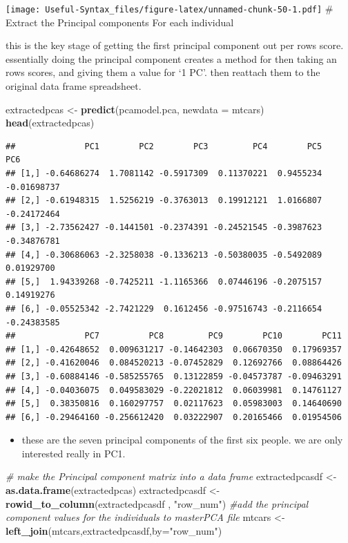 \documentclass[
]{article}
\newenvironment{Shaded}{\begin{snugshade}}{\end{snugshade}}
\newcommand{\AttributeTok}[1]{\textcolor[rgb]{0.13,0.29,0.53}{#1}}
\newcommand{\CommentTok}[1]{\textcolor[rgb]{0.56,0.35,0.01}{\textit{#1}}}
\newcommand{\FunctionTok}[1]{\textcolor[rgb]{0.13,0.29,0.53}{\textbf{#1}}}
\newcommand{\NormalTok}[1]{#1}
\newcommand{\OtherTok}[1]{\textcolor[rgb]{0.56,0.35,0.01}{#1}}
\newcommand{\StringTok}[1]{\textcolor[rgb]{0.31,0.60,0.02}{#1}}
\providecommand{\tightlist}{%
  \setlength{\itemsep}{0pt}\setlength{\parskip}{0pt}}
\begin{document}
\texttt{[image: Useful-Syntax\_files/figure-latex/unnamed-chunk-50-1.pdf]}
\# Extract the Principal components For each individual

this is the key stage of getting the first principal component out per rows score. essentially doing the principal component creates a method for then taking an rows scores, and giving them a value for `1 PC'. then reattach them to the original data frame spreadsheet.

\begin{Shaded}
\begin{Highlighting}[]
\NormalTok{extractedpcas }\OtherTok{\textless{}{-}} \FunctionTok{predict}\NormalTok{(pcamodel.pca, }\AttributeTok{newdata =}\NormalTok{ mtcars)}
\FunctionTok{head}\NormalTok{(extractedpcas)}
\end{Highlighting}
\end{Shaded}

\begin{verbatim}
##              PC1        PC2        PC3         PC4        PC5         PC6
## [1,] -0.64686274  1.7081142 -0.5917309  0.11370221  0.9455234 -0.01698737
## [2,] -0.61948315  1.5256219 -0.3763013  0.19912121  1.0166807 -0.24172464
## [3,] -2.73562427 -0.1441501 -0.2374391 -0.24521545 -0.3987623 -0.34876781
## [4,] -0.30686063 -2.3258038 -0.1336213 -0.50380035 -0.5492089  0.01929700
## [5,]  1.94339268 -0.7425211 -1.1165366  0.07446196 -0.2075157  0.14919276
## [6,] -0.05525342 -2.7421229  0.1612456 -0.97516743 -0.2116654 -0.24383585
##              PC7          PC8         PC9        PC10        PC11
## [1,] -0.42648652  0.009631217 -0.14642303  0.06670350  0.17969357
## [2,] -0.41620046  0.084520213 -0.07452829  0.12692766  0.08864426
## [3,] -0.60884146 -0.585255765  0.13122859 -0.04573787 -0.09463291
## [4,] -0.04036075  0.049583029 -0.22021812  0.06039981  0.14761127
## [5,]  0.38350816  0.160297757  0.02117623  0.05983003  0.14640690
## [6,] -0.29464160 -0.256612420  0.03222907  0.20165466  0.01954506
\end{verbatim}

\begin{itemize}
\tightlist
\item
  these are the seven principal components of the first six people. we are only interested really in PC1.
\end{itemize}

\begin{Shaded}
\begin{Highlighting}[]
\CommentTok{\# make the Principal component matrix into a data frame }
\NormalTok{extractedpcasdf }\OtherTok{\textless{}{-}} \FunctionTok{as.data.frame}\NormalTok{(extractedpcas)}
\NormalTok{extractedpcasdf }\OtherTok{\textless{}{-}} \FunctionTok{rowid\_to\_column}\NormalTok{(extractedpcasdf , }\StringTok{"row\_num"}\NormalTok{)}
\CommentTok{\#add the principal component values for the individuals to masterPCA file}
\NormalTok{mtcars }\OtherTok{\textless{}{-}} \FunctionTok{left\_join}\NormalTok{(mtcars,extractedpcasdf,}\AttributeTok{by=}\StringTok{"row\_num"}\NormalTok{)}
\end{Highlighting}
\end{Shaded}
\end{document}

